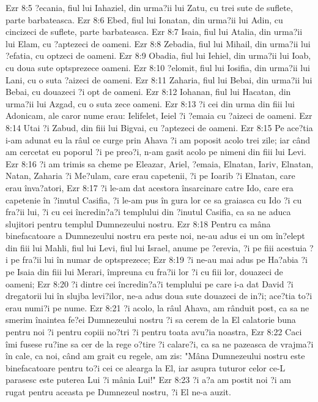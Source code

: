 Ezr 8:5  ?ecania, fiul lui Iahaziel, din urma?ii lui Zatu, cu trei sute de suflete, parte barbateasca.
Ezr 8:6  Ebed, fiul lui Ionatan, din urma?ii lui Adin, cu cincizeci de suflete, parte barbateasca.
Ezr 8:7  Isaia, fiul lui Atalia, din urma?ii lui Elam, cu ?aptezeci de oameni.
Ezr 8:8  Zebadia, fiul lui Mihail, din urma?ii lui ?efatia, cu optzeci de oameni.
Ezr 8:9  Obadia, fiul lui Iehiel, din urma?ii lui Ioab, cu doua sute optsprezece oameni.
Ezr 8:10  ?elomit, fiul lui Iosifia, din urma?ii lui Lani, cu o suta ?aizeci de oameni.
Ezr 8:11  Zaharia, fiul lui Bebai, din urma?ii lui Bebai, cu douazeci ?i opt de oameni.
Ezr 8:12  Iohanan, fiul lui Hacatan, din urma?ii lui Azgad, cu o suta zece oameni.
Ezr 8:13  ?i cei din urma din fiii lui Adonicam, ale caror nume erau: Ielifelet, Ieiel ?i ?emaia cu ?aizeci de oameni.
Ezr 8:14  Utai ?i Zabud, din fiii lui Bigvai, cu ?aptezeci de oameni.
Ezr 8:15  Pe ace?tia i-am adunat eu la râul ce curge prin Ahava ?i am poposit acolo trei zile; iar când am cercetat eu poporul ?i pe preo?i, n-am gasit acolo pe nimeni din fiii lui Levi.
Ezr 8:16  ?i am trimis sa cheme pe Eleazar, Ariel, ?emaia, Elnatan, Iariv, Elnatan, Natan, Zaharia ?i Me?ulam, care erau capetenii, ?i pe Ioarib ?i Elnatan, care erau înva?atori,
Ezr 8:17  ?i le-am dat acestora însarcinare catre Ido, care era capetenie în ?inutul Casifia, ?i le-am pus în gura lor ce sa graiasca cu Ido ?i cu fra?ii lui, ?i cu cei încredin?a?i templului din ?inutul Casifia, ca sa ne aduca slujitori pentru templul Dumnezeului nostru.
Ezr 8:18  Pentru ca mâna binefacatoare a Dumnezeului nostru era peste noi, ne-au adus ei un om în?elept din fiii lui Mahli, fiul lui Levi, fiul lui Israel, anume pe ?erevia, ?i pe fiii acestuia ?i pe fra?ii lui în numar de optsprezece;
Ezr 8:19  ?i ne-au mai adus pe Ha?abia ?i pe Isaia din fiii lui Merari, împreuna cu fra?ii lor ?i cu fiii lor, douazeci de oameni;
Ezr 8:20  ?i dintre cei încredin?a?i templului pe care i-a dat David ?i dregatorii lui în slujba levi?ilor, ne-a adus doua sute douazeci de in?i; ace?tia to?i erau numi?i pe nume.
Ezr 8:21  ?i acolo, la râul Ahava, am rânduit post, ca sa ne smerim înaintea fe?ei Dumnezeului nostru ?i sa cerem de la El calatorie buna pentru noi ?i pentru copiii no?tri ?i pentru toata avu?ia noastra,
Ezr 8:22  Caci îmi fusese ru?ine sa cer de la rege o?tire ?i calare?i, ca sa ne pazeasca de vrajma?i în cale, ca noi, când am grait cu regele, am zis: "Mâna Dumnezeului nostru este binefacatoare pentru to?i cei ce alearga la El, iar asupra tuturor celor ce-L parasesc este puterea Lui ?i mânia Lui!"
Ezr 8:23  ?i a?a am postit noi ?i am rugat pentru aceasta pe Dumnezeul nostru, ?i El ne-a auzit.
